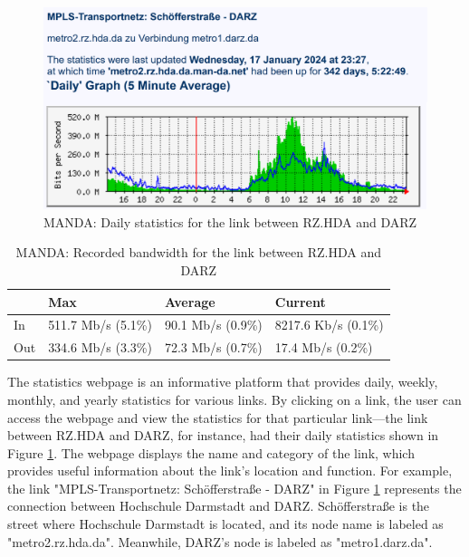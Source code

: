 \documentclass[sigconf,authorversion,nonacm]{acmart}
\begin{document}
\begin{figure}
    \centering
    \includegraphics[width=\linewidth]{MANDA/statistics link darmsdat.PNG}
    \caption{MANDA: Daily statistics for the link between RZ.HDA and DARZ}
    \label{MANDA: Daily statistics of}
\end{figure}

\begin{table}[!ht]
    \centering
    \caption{MANDA: Recorded bandwidth for the link between RZ.HDA and DARZ}
    \label{MANDA: Recorded bandwidth for the link between RZ.HDA and DARZ}
    \begin{tabular}{|l|l|l|l|}
    \hline
        & Max                & Average           & Current             \\ \hline
    In  & 511.7 Mb/s (5.1\%) & 90.1 Mb/s (0.9\%) & 8217.6 Kb/s (0.1\%) \\ \hline
    Out & 334.6 Mb/s (3.3\%) & 72.3 Mb/s (0.7\%) & 17.4 Mb/s (0.2\%) \\ \hline
    \end{tabular}
\end{table}

The statistics webpage is an informative platform that provides daily, weekly, monthly, and yearly statistics for various links. By clicking on a link, the user can access the webpage and view the statistics for that particular link—the link between RZ.HDA and DARZ, for instance, had their daily statistics shown in Figure \ref{MANDA: Daily statistics of}. The webpage displays the name and category of the link, which provides useful information about the link's location and function. For example, the link "MPLS-Transportnetz: Schöfferstraße - DARZ" in Figure \ref{MANDA: Daily statistics of} represents the connection between Hochschule Darmstadt and DARZ. Schöfferstraße is the street where Hochschule Darmstadt is located, and its node name is labeled as "metro2.rz.hda.da". Meanwhile, DARZ's node is labeled as "metro1.darz.da". 
\end{document}
